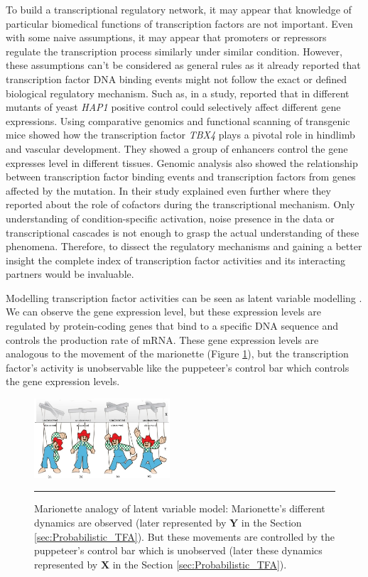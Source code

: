 To build a transcriptional regulatory network, it may appear that knowledge of particular biomedical functions of transcription factors are not important. Even with some naive assumptions, it may appear that promoters or repressors regulate the transcription process similarly under similar condition. However, these assumptions can't be considered as general rules as it already reported that transcription factor DNA binding events might not follow the exact or defined biological regulatory mechanism. Such as, in a study, \cite{Turcotte:1992} reported that in different mutants of yeast \emph{HAP1} positive control could selectively affect different gene expressions. Using comparative genomics and functional scanning of transgenic mice \cite{Menke:2008} showed how the transcription factor \emph{TBX4} plays a pivotal role in hindlimb and vascular development. They showed a group of enhancers control the gene expresses level in different tissues. Genomic analysis also showed the relationship between transcription factor binding events and transcription factors from genes affected by the mutation. In their study \cite{Hughes:2013} explained even further where they reported about the role of cofactors during the transcriptional mechanism. Only understanding of condition-specific activation, noise presence in the data or transcriptional cascades is not enough to grasp the actual understanding of these phenomena. Therefore, to dissect the regulatory mechanisms and gaining a better insight the complete index of transcription factor activities and its interacting partners would be invaluable.

Modelling transcription factor activities can be seen as latent variable modelling \cite{Bishop:1999, Lawrence:2005}. We can observe the gene expression level, but these expression levels are regulated by protein-coding genes that bind to a specific DNA sequence and controls the production rate of mRNA. These gene expression levels are analogous to the movement of the marionette (Figure \ref{fig:LVM_Cartoon}), but the transcription factor's activity is unobservable like the puppeteer's control bar which controls the gene expression levels.
\begin{figure}
	\centering
		\includegraphics[width=0.45\textwidth,keepaspectratio]{diagrams/LVM_Cartoon.png}
	\rule{25em}{0.5pt}
	\caption[Marionette analogy of latent variable model]
	{Marionette analogy of latent variable model: Marionette's different dynamics are observed (later represented by $\textbf{Y}$ in the Section \ref{sec:Probabilistic_TFA}). But these movements are controlled by the puppeteer's control bar which is unobserved (later these dynamics represented by $\textbf{X}$ in the Section \ref{sec:Probabilistic_TFA}).}
	\label{fig:LVM_Cartoon}
\end{figure}

